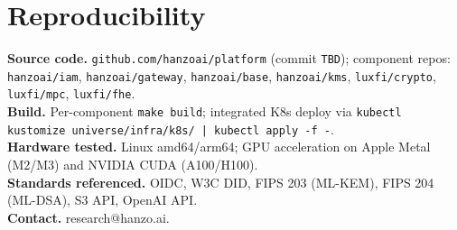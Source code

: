 \documentclass[11pt,twocolumn]{article}
\begin{document}

























\onecolumn
\section*{Reproducibility}
\textbf{Source code.} \texttt{github.com/hanzoai/platform} (commit \texttt{TBD}); component repos: \texttt{hanzoai/iam}, \texttt{hanzoai/gateway}, \texttt{hanzoai/base}, \texttt{hanzoai/kms}, \texttt{luxfi/crypto}, \texttt{luxfi/mpc}, \texttt{luxfi/fhe}.\\
\textbf{Build.} Per-component \texttt{make build}; integrated K8s deploy via \texttt{kubectl kustomize universe/infra/k8s/ | kubectl apply -f -}.\\
\textbf{Hardware tested.} Linux amd64/arm64; GPU acceleration on Apple Metal (M2/M3) and NVIDIA CUDA (A100/H100).\\
\textbf{Standards referenced.} OIDC, W3C DID, FIPS 203 (ML-KEM), FIPS 204 (ML-DSA), S3 API, OpenAI API.\\
\textbf{Contact.} research@hanzo.ai.
\end{document}

